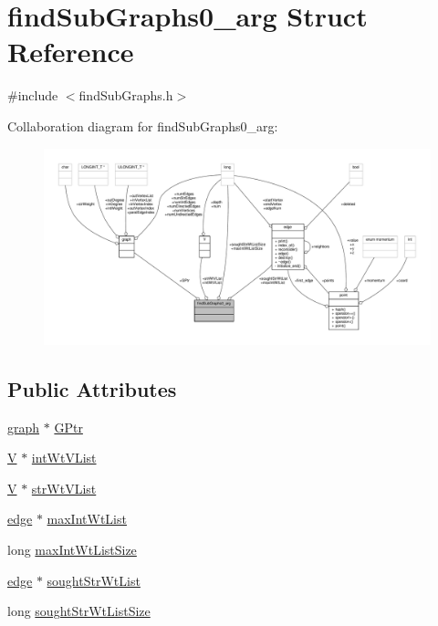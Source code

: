 \hypertarget{structfindSubGraphs0__arg}{\section{find\-Sub\-Graphs0\-\_\-arg Struct Reference}
\label{structfindSubGraphs0__arg}
}


{\ttfamily \#include $<$find\-Sub\-Graphs.\-h$>$}



Collaboration diagram for find\-Sub\-Graphs0\-\_\-arg\-:
\nopagebreak
\begin{figure}[H]
\begin{center}
\leavevmode
\includegraphics[width=350pt]{structfindSubGraphs0__arg__coll__graph}
\end{center}
\end{figure}
\subsection*{Public Attributes}
\begin{DoxyCompactItemize}
\item 
\hyperlink{structgraph}{graph} $\ast$ \hyperlink{structfindSubGraphs0__arg_a57bbd41d47c5c813af690de9e487f765}{G\-Ptr}
\item 
\hyperlink{structV}{V} $\ast$ \hyperlink{structfindSubGraphs0__arg_a3c16ee21dc5a137eed173f76d0733afa}{int\-Wt\-V\-List}
\item 
\hyperlink{structV}{V} $\ast$ \hyperlink{structfindSubGraphs0__arg_a5cfb522d5c47913082c53493c11c9eaa}{str\-Wt\-V\-List}
\item 
\hyperlink{classedge}{edge} $\ast$ \hyperlink{structfindSubGraphs0__arg_ad4c2c667064fb9c71233fc71a5d36928}{max\-Int\-Wt\-List}
\item 
long \hyperlink{structfindSubGraphs0__arg_a9d6e7767adbe5c607e94610315409aaf}{max\-Int\-Wt\-List\-Size}
\item 
\hyperlink{classedge}{edge} $\ast$ \hyperlink{structfindSubGraphs0__arg_af6415f605238c71e9fbb391bc8425137}{sought\-Str\-Wt\-List}
\item 
long \hyperlink{structfindSubGraphs0__arg_a5ee9928a3be6cc59ed7a5b864ef4c4c9}{sought\-Str\-Wt\-List\-Size}
\end{DoxyCompactItemize}


